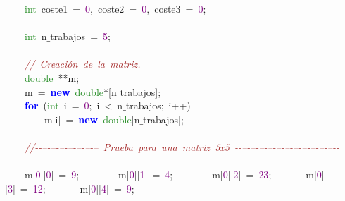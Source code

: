 \mbox{}\ \ \ \ \textcolor{ForestGreen}{int}\ coste1\ \textcolor{BrickRed}{=}\ \textcolor{Purple}{0}\textcolor{BrickRed}{,}\ coste2\ \textcolor{BrickRed}{=}\ \textcolor{Purple}{0}\textcolor{BrickRed}{,}\ coste3\ \textcolor{BrickRed}{=}\ \textcolor{Purple}{0}\textcolor{BrickRed}{;}\ \  \\
\mbox{} \\
\mbox{}\ \ \ \ \textcolor{ForestGreen}{int}\ n$\_$trabajos\ \textcolor{BrickRed}{=}\ \textcolor{Purple}{5}\textcolor{BrickRed}{;}\  \\
\mbox{} \\
\mbox{}\ \ \ \ \textit{\textcolor{Brown}{//\ Creación\ de\ la\ matriz.\ }} \\
\mbox{}\ \ \ \ \textcolor{ForestGreen}{double}\ \textcolor{BrickRed}{**}m\textcolor{BrickRed}{;}\  \\
\mbox{}\ \ \ \ m\ \textcolor{BrickRed}{=}\ \textbf{\textcolor{Blue}{new}}\ \textcolor{ForestGreen}{double}\textcolor{BrickRed}{*[}n$\_$trabajos\textcolor{BrickRed}{];}\  \\
\mbox{}\ \ \ \ \textbf{\textcolor{Blue}{for}}\ \textcolor{BrickRed}{(}\textcolor{ForestGreen}{int}\ i\ \textcolor{BrickRed}{=}\ \textcolor{Purple}{0}\textcolor{BrickRed}{;}\ i\ \textcolor{BrickRed}{\textless{}}\ n$\_$trabajos\textcolor{BrickRed}{;}\ i\textcolor{BrickRed}{++)} \\
\mbox{}\ \ \ \ \ \ \ \ m\textcolor{BrickRed}{[}i\textcolor{BrickRed}{]}\ \textcolor{BrickRed}{=}\ \textbf{\textcolor{Blue}{new}}\ \textcolor{ForestGreen}{double}\textcolor{BrickRed}{[}n$\_$trabajos\textcolor{BrickRed}{];}\  \\
\mbox{} \\
\mbox{}\ \ \ \ \textit{\textcolor{Brown}{//-\/-\/--\/-\/--\/-\/--\/-\/--\/-\/--\/-\/--\/-\/--\ Prueba\ para\ una\ matriz\ 5x5\ -\/-\/--\/-\/--\/-\/--\/-\/--\/-\/--\/-\/--\/-\/--\/-\/--\/-\/--\/-\/--\/-\/--\/-\/-}} \\
\mbox{} \\
\mbox{}\ \ \ \ m\textcolor{BrickRed}{[}\textcolor{Purple}{0}\textcolor{BrickRed}{][}\textcolor{Purple}{0}\textcolor{BrickRed}{]}\ \textcolor{BrickRed}{=}\ \textcolor{Purple}{9}\textcolor{BrickRed}{;}\ \ \ \ \ \ \ \ m\textcolor{BrickRed}{[}\textcolor{Purple}{0}\textcolor{BrickRed}{][}\textcolor{Purple}{1}\textcolor{BrickRed}{]}\ \textcolor{BrickRed}{=}\ \textcolor{Purple}{4}\textcolor{BrickRed}{;}\ \ \ \ \ \ \ \ m\textcolor{BrickRed}{[}\textcolor{Purple}{0}\textcolor{BrickRed}{][}\textcolor{Purple}{2}\textcolor{BrickRed}{]}\ \textcolor{BrickRed}{=}\ \textcolor{Purple}{23}\textcolor{BrickRed}{;}\ \ \ \ \ \ \ m\textcolor{BrickRed}{[}\textcolor{Purple}{0}\textcolor{BrickRed}{][}\textcolor{Purple}{3}\textcolor{BrickRed}{]}\ \textcolor{BrickRed}{=}\ \textcolor{Purple}{12}\textcolor{BrickRed}{;}\ \ \ \ \ \ \ m\textcolor{BrickRed}{[}\textcolor{Purple}{0}\textcolor{BrickRed}{][}\textcolor{Purple}{4}\textcolor{BrickRed}{]}\ \textcolor{BrickRed}{=}\ \textcolor{Purple}{9}\textcolor{BrickRed}{;}\  \\
